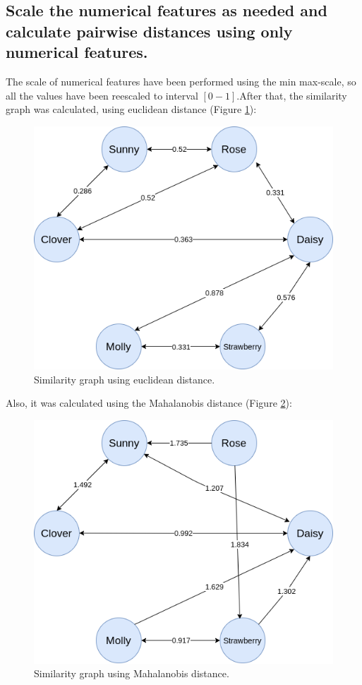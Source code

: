 \documentclass[12pt]{article}
\begin{document}
\subsection{Scale the numerical features as needed and calculate pairwise distances using only numerical features.}

The scale of numerical features have been performed using the min max-scale, so all the values have been reescaled to interval $[0-1]$.After that, the similarity graph was calculated, using euclidean distance (Figure \ref{fig:eucl-graph}):

\begin{figure}[h]
    \centering
    \includegraphics[scale=0.3]{assignment-1/plots/task-4/task-4-a-1.png}
    \caption{Similarity graph using euclidean distance.}
    \label{fig:eucl-graph}
\end{figure}

Also, it was calculated using the Mahalanobis distance (Figure \ref{fig:maha-graph}):

\begin{figure}[h]
    \centering
    \includegraphics[scale=0.3]{assignment-1/plots/task-4/task-4-a-2.png}
    \caption{Similarity graph using Mahalanobis distance.}
    \label{fig:maha-graph}
\end{figure}
\end{document}
